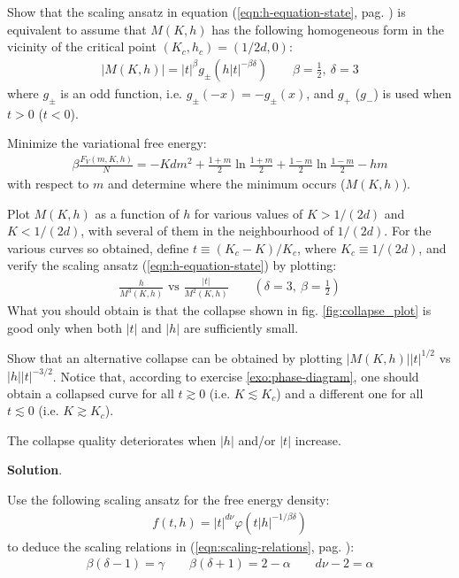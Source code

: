 \documentclass[../../main.tex]{subfiles}
\begin{document}
\begin{exo}
    Show that the scaling ansatz in equation (\ref{eqn:h-equation-state}, pag. \pageref{eqn:h-equation-state}) is equivalent to assume that $M(K,h)$ has the following homogeneous form in the vicinity of the critical point $(K_c, h_c) = (1/2d, 0)$:
    \begin{align*}
        |M(K,h)| = |t|^\beta g_{\pm} (h|t|^{-\beta \delta}) \qquad \beta = \frac{1}{2}, \> \delta=3 
    \end{align*}
    where $g_\pm$ is an odd function, i.e. $g_{\pm}(-x) = - g_{\pm}(x)$, and $g_+$ ($g_-$) is used when $t>0$ ($t<0$).
\end{exo}

\begin{exo}
    Minimize the variational free energy:
    \begin{align*}
        \beta \frac{F_V(m,K,h)}{N} = - Kd m^2 + \frac{1+m}{2} \ln \frac{1+m}{2} + \frac{1-m}{2} \ln \frac{1-m}{2} - hm    
    \end{align*}
    with respect to $m$ and determine where the minimum occurs ($M(K,h)$).

    Plot $M(K,h)$ as a function of $h$ for various values of $K > 1/(2d)$ and $K < 1/(2d)$, with several of them in the neighbourhood of $1/(2d)$. For the various curves so obtained, define $t \equiv (K_c - K)/K_c$, where $K_c \equiv 1/(2d)$, and verify the scaling ansatz (\ref{eqn:h-equation-state}) by plotting:
    \begin{align*}
        \frac{h}{M^3(K,h)} \text{ vs } \frac{|t|}{M^2(K,h)} \qquad (\delta = 3, \> \beta = \frac{1}{2} )
    \end{align*}
    What you should obtain is that the collapse shown in fig. \ref{fig:collapse_plot} is good only when both $|t|$ and $|h|$ are sufficiently small.

    Show that an alternative collapse can be obtained by plotting $|M(K,h)| |t|^{1/2}$ vs $|h| |t|^{-3/2}$. Notice that, according to exercise \ref{exo:phase-diagram}, one should obtain a collapsed curve for all $t \gtrsim 0$ (i.e. $K \lesssim K_c$) and a different one for all $t \lesssim 0$ (i.e. $K \gtrsim K_c$).

    The collapse quality deteriorates when $|h|$ and/or $|t|$ increase.

    \medskip

    \textbf{Solution}. 
\end{exo}

\begin{exo}
    Use the following scaling ansatz for the free energy density:
    \begin{align*}
        f(t,h) = |t|^{d \nu} \varphi(t|h|^{-1/\beta \delta})
    \end{align*}
    to deduce the scaling relations in (\ref{eqn:scaling-relations}, pag. \pageref{eqn:scaling-relations}):
    \begin{align*}
        \beta(\delta-1) = \gamma \qquad \beta(\delta+1) = 2 - \alpha \qquad d \nu -2 = \alpha
    \end{align*}
\end{exo}
\end{document}
